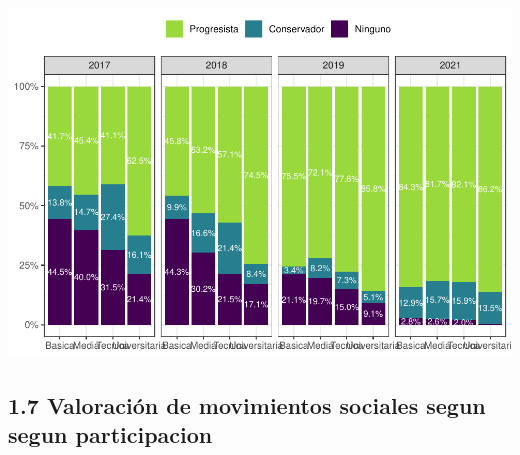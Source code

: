 \documentclass[
  12pt,
]{book}
\begin{document}
\includegraphics{reporte-elsoc_files/figure-latex/unnamed-chunk-11-1.pdf}

\hypertarget{valoraciuxf3n-de-movimientos-sociales-segun-segun-participacion}{%
\subsection{1.7 Valoración de movimientos sociales segun segun participacion}\label{valoraciuxf3n-de-movimientos-sociales-segun-segun-participacion}}
\end{document}
